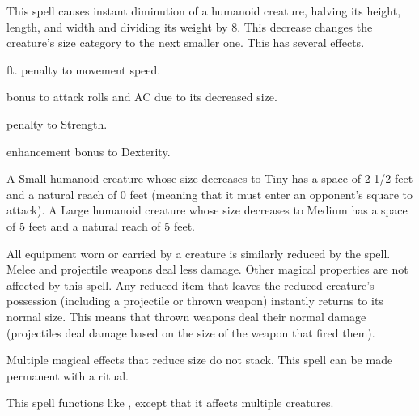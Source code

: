 \spellrng{\rngclose}
\begin{spelleffect}
  This spell causes instant diminution of a humanoid creature, halving its height, length, and width and dividing its weight by 8. This decrease changes the creature's size category to the next smaller one. This has several effects.
  \begin{itemize*} 
    \item {} ft. penalty to movement speed.
    \item {} bonus to attack rolls and AC due to its decreased size.
  \item {} penalty to Strength.
  \item {} enhancement bonus to Dexterity.
  \end{itemize*}
  \par A Small humanoid creature whose size decreases to Tiny has a space of 2-1/2 feet and a natural reach of 0 feet (meaning that it must enter an opponent's square to attack). A Large humanoid creature whose size decreases to Medium has a space of 5 feet and a natural reach of 5 feet.
  \par All equipment worn or carried by a creature is similarly reduced by the spell. Melee and projectile weapons deal less damage. Other magical properties are not affected by this spell. Any reduced item that leaves the reduced creature's possession (including a projectile or thrown weapon) instantly returns to its normal size. This means that thrown weapons deal their normal damage (projectiles deal damage based on the size of the weapon that fired them).
\end{spelleffect}
\begin{spellnotes}
  Multiple magical effects that reduce size do not stack. This spell can be made permanent with a  ritual.
\end{spellnotes}

\spellrng{\rngmed}
\begin{spelleffect}
  This spell functions like , except that it affects multiple creatures.
\end{spelleffect}

